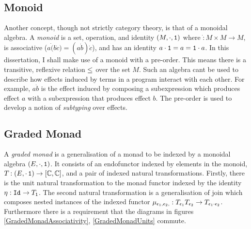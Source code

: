 \documentclass{Report}
\begin{document}
\subsection{Monoid}

Another concept, though not strictly category theory, is that of a monoidal algebra. A \textit{monoid} is a set, operation, and identity $(M, \cdot, \texttt{1})$ where $\dot: M\times M \rightarrow M$, is associative ($a\dot(b\dot c) = (a\dot b)\dot c$), and has an identity $a\cdot\texttt{1} = a = \texttt{1}\cdot a$. In this dissertation, I shall make use of a monoid with a pre-order. This means there is a transitive, reflexive relation $\leq$ over the set $M$. Such an algebra cant be used to describe how effects induced by terms in a program interact with each other. For example, $a \dot b$ is the effect induced by composing a subexpression which produces effect $a$ with a subexpression that produces effect $b$. The pre-order is used to develop a notion of \textit{subtyping} over effects.

\subsection{Graded Monad}


A \textit{graded monad} is a generalisation of a monad to be indexed by a monoidal algebra $(E,\cdot, \texttt{1})$. It consists of an endofunctor indexed by elements in the monoid, $T_{}{}: (E, \cdot\, \texttt{1})  \rightarrow [\mathbb{C}, \mathbb{C}]$, and a pair of indexed natural transformations. Firstly, there is the unit natural transformation to the monad functor indexed by the identity $\eta_{}: \texttt{Id}_{} \rightarrow T_{\texttt{1}}{}$. The second natural transformation is a generalisation of join which composes nested instances of the indexed functor $\mu_{\epsilon_1, \epsilon_2, }: T_{\epsilon_1}{T_{\epsilon_2}{}} \rightarrow T_{\epsilon_1 \cdot \epsilon_2}{}$. Furthermore there is a requirement that the diagrams in figures \ref{GradedMonadAssociativity}, \ref{GradedMonadUnits} commute.
\end{document}
